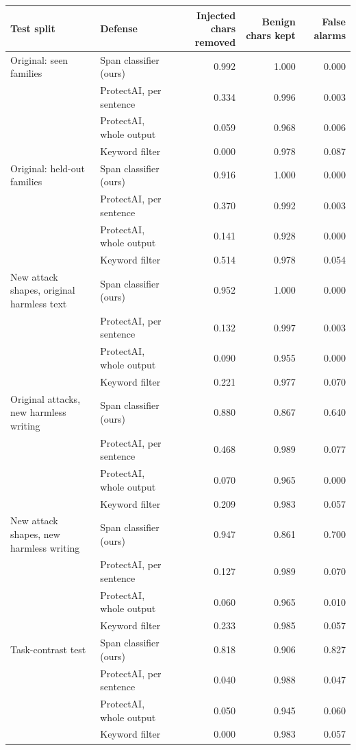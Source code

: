 \begin{tabular}{llrrr}
\toprule
Test split & Defense & Injected chars removed & Benign chars kept & False alarms \\
\midrule
Original: seen families & Span classifier (ours) & 0.992 & 1.000 & 0.000 \\
 & ProtectAI, per sentence & 0.334 & 0.996 & 0.003 \\
 & ProtectAI, whole output & 0.059 & 0.968 & 0.006 \\
 & Keyword filter & 0.000 & 0.978 & 0.087 \\
\midrule
Original: held-out families & Span classifier (ours) & 0.916 & 1.000 & 0.000 \\
 & ProtectAI, per sentence & 0.370 & 0.992 & 0.003 \\
 & ProtectAI, whole output & 0.141 & 0.928 & 0.000 \\
 & Keyword filter & 0.514 & 0.978 & 0.054 \\
\midrule
New attack shapes, original harmless text & Span classifier (ours) & 0.952 & 1.000 & 0.000 \\
 & ProtectAI, per sentence & 0.132 & 0.997 & 0.003 \\
 & ProtectAI, whole output & 0.090 & 0.955 & 0.000 \\
 & Keyword filter & 0.221 & 0.977 & 0.070 \\
\midrule
Original attacks, new harmless writing & Span classifier (ours) & 0.880 & 0.867 & 0.640 \\
 & ProtectAI, per sentence & 0.468 & 0.989 & 0.077 \\
 & ProtectAI, whole output & 0.070 & 0.965 & 0.000 \\
 & Keyword filter & 0.209 & 0.983 & 0.057 \\
\midrule
New attack shapes, new harmless writing & Span classifier (ours) & 0.947 & 0.861 & 0.700 \\
 & ProtectAI, per sentence & 0.127 & 0.989 & 0.070 \\
 & ProtectAI, whole output & 0.060 & 0.965 & 0.010 \\
 & Keyword filter & 0.233 & 0.985 & 0.057 \\
\midrule
Task-contrast test & Span classifier (ours) & 0.818 & 0.906 & 0.827 \\
 & ProtectAI, per sentence & 0.040 & 0.988 & 0.047 \\
 & ProtectAI, whole output & 0.050 & 0.945 & 0.060 \\
 & Keyword filter & 0.000 & 0.983 & 0.057 \\
\bottomrule
\end{tabular}
